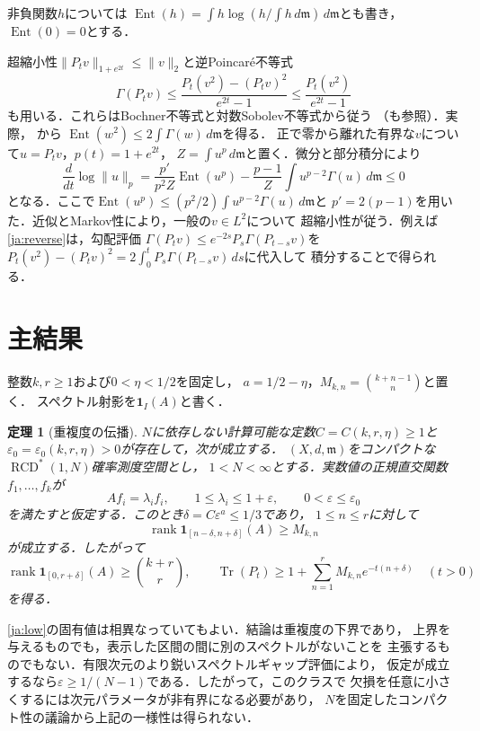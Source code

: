 \documentclass[12pt]{amsart}
\theoremstyle{definition}
\theoremstyle{remark}
\numberwithin{equation}{section}
\newcommand{\rank}{\operatorname{rank}}
\DeclareMathOperator{\Ent}{Ent}
\DeclareMathOperator{\Tr}{Tr}
\newcommand{\RCD}{\operatorname{RCD}^{*}}
\newcommand{\dm}{\,d\mathfrak m}
\newcommand{\one}{\mathbf 1}
\newcommand{\eps}{\varepsilon}
\theoremstyle{plain}
\newtheorem{jathm}[thm]{定理}
\begin{document}
非負関数$h$については
$\Ent(h)=\int h\log(h/\int h\dm)\dm$とも書き，$\Ent(0)=0$とする．

超縮小性$\|P_t v\|_{1+e^{2t}}\leq\|v\|_2$と逆Poincar\'e不等式
\begin{equation}\label{ja:reverse}
 \Gamma(P_tv)\leq\frac{P_t(v^2)-(P_tv)^2}{e^{2t}-1}
                  \leq\frac{P_t(v^2)}{e^{2t}-1}
\end{equation}
も用いる．これらはBochner不等式と対数Sobolev不等式から従う
（\cite[Proposition 3.2]{ja:BF}も参照）．実際，
\cite[Corollary 3.28]{ja:EKS}から
$\Ent(w^2)\leq2\int\Gamma(w)\dm$を得る．
正で零から離れた有界な$v$について$u=P_tv$，$p(t)=1+e^{2t}$，
$Z=\int u^p\dm$と置く．微分と部分積分により
\[
 \frac{d}{dt}\log\|u\|_p
 =\frac{p'}{p^2Z}\Ent(u^p)
   -\frac{p-1}{Z}\int u^{p-2}\Gamma(u)\dm\leq0
\]
となる．ここで$\Ent(u^p)\leq(p^2/2)\int u^{p-2}\Gamma(u)\dm$と
$p'=2(p-1)$を用いた．近似とMarkov性により，一般の$v\in L^2$について
超縮小性が従う．例えば\eqref{ja:reverse}は，勾配評価\cite[Corollary 3.5]{ja:S}
$\Gamma(P_t v)\leq e^{-2s}P_s\Gamma(P_{t-s}v)$を
$P_t(v^2)-(P_tv)^2=2\int_0^tP_s\Gamma(P_{t-s}v)\,ds$に代入して
積分することで得られる．

\section{主結果}
整数$k,r\geq1$および$0<\eta<1/2$を固定し，
$a=1/2-\eta$，$M_{k,n}=\binom{k+n-1}{n}$と置く．
スペクトル射影を$\one_I(A)$と書く．

\begin{jathm}[重複度の伝播]\label{ja:main}
$N$に依存しない計算可能な定数$C=C(k,r,\eta)\geq1$と
$\eps_0=\eps_0(k,r,\eta)>0$が存在して，次が成立する．
$(X,d,\mathfrak m)$をコンパクトな$\RCD(1,N)$確率測度空間とし，
$1<N<\infty$とする．実数値の正規直交関数$f_1,\ldots,f_k$が
\begin{equation}\label{ja:low}
 Af_i=\lambda_i f_i,\qquad 1\leq\lambda_i\leq1+\eps,
 \qquad 0<\eps\leq\eps_0
\end{equation}
を満たすと仮定する．このとき$\delta=C\eps^a\leq1/3$であり，
$1\leq n\leq r$に対して
\begin{equation}\label{ja:rank}
 \rank\one_{[n-\delta,n+\delta]}(A)\geq M_{k,n}
\end{equation}
が成立する．したがって
\begin{equation}\label{ja:count}
 \rank\one_{[0,r+\delta]}(A)\geq\binom{k+r}{r},\qquad
 \Tr(P_t)\geq1+\sum_{n=1}^rM_{k,n}e^{-t(n+\delta)}\quad(t>0)
\end{equation}
を得る．
\end{jathm}
\eqref{ja:low}の固有値は相異なっていてもよい．結論は重複度の下界であり，
上界を与えるものでも，表示した区間の間に別のスペクトルがないことを
主張するものでもない．有限次元のより鋭いスペクトルギャップ評価により，
仮定が成立するなら$\eps\geq1/(N-1)$である．したがって，このクラスで
欠損を任意に小さくするには次元パラメータが非有界になる必要があり，
$N$を固定したコンパクト性の議論から上記の一様性は得られない．
\end{document}
